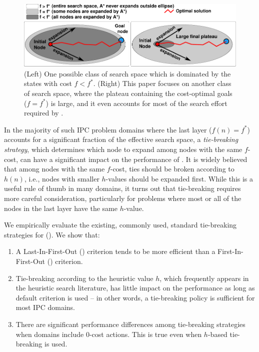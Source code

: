 \begin{figure}[htbp]
  \centering
  \includegraphics{img/astar/plateau-0.pdf}
 \caption{(Left) One possible class of search space which is dominated by the states with cost $f<f^*$. (Right) This paper focuses on another class of search space, where the plateau containing the cost-optimal goals ($f=f^*$) is large, and it even accounts for most of the search effort required by \astar. %
  }
 \label{fig:plateau-0}
\end{figure}

In the majority of such IPC problem domains where
the last layer ($f(n)=f^*$) accounts for a significant fraction of the effective search space, a
\emph{tie-breaking strategy}, which determines which node to expand among nodes with the same $f$-cost,
can have a significant impact on the performance of \astar.
It is widely believed that among nodes with the same $f$-cost,
ties should be broken according to $h(n)$, i.e.,
nodes with smaller $h$-values should be expanded first.  While this is a
useful rule of thumb in many domains, it turns out that tie-breaking
requires more careful consideration, particularly for problems where
most or all of the nodes in the last layer have the same $h$-value.

We empirically evaluate the existing, commonly used, standard
tie-breaking strategies for \astar ().
We show that:

\begin{enumerate}
 \item A Last-In-First-Out (\lifo) criterion tends to be more efficient
       than a First-In-First-Out (\fifo) criterion.
 \item Tie-breaking according to the heuristic value $h$, which
       frequently appears in the heuristic search literature, has little
       impact on the performance as long as \lifo default criterion is used 
       --  in other words, a \lifo tie-breaking policy is sufficient for most IPC domains.
 \item There are significant performance differences among tie-breaking strategies
       when domains include 0-cost actions. This is true even when $h$-based tie-breaking is used.
\end{enumerate}


